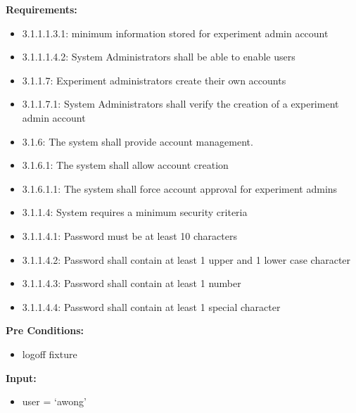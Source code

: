 \documentclass[letterpaper,10pt,english]{sphinxmanual}
\begin{document}
\begin{fulllineitems}
\label{STD/test_create_account:test_create_account.test_create_experiment_admin}
\textbf{Requirements:}
\begin{itemize}
\item {} 
3.1.1.1.3.1: minimum information stored for experiment admin account

\item {} 
3.1.1.1.4.2: System Administrators shall be able to enable users

\item {} 
3.1.1.7: Experiment administrators create their own accounts

\item {} 
3.1.1.7.1: System Administrators shall verify the creation of a experiment admin account

\item {} 
3.1.6: The system shall provide account management.

\item {} 
3.1.6.1: The system shall allow account creation

\item {} 
3.1.6.1.1: The system shall force account approval for experiment admins

\item {} 
3.1.1.4: System requires a minimum security criteria

\item {} 
3.1.1.4.1: Password must be at least 10 characters

\item {} 
3.1.1.4.2: Password shall contain at least 1 upper and 1 lower case character

\item {} 
3.1.1.4.3: Password shall contain at least 1 number

\item {} 
3.1.1.4.4: Password shall contain at least 1 special character

\end{itemize}

\textbf{Pre Conditions:}
\begin{itemize}
\item {} 
logoff fixture

\end{itemize}

\textbf{Input:}
\begin{itemize}
\item {} 
user = `awong'


\end{itemize}
\end{fulllineitems}
\end{document}
